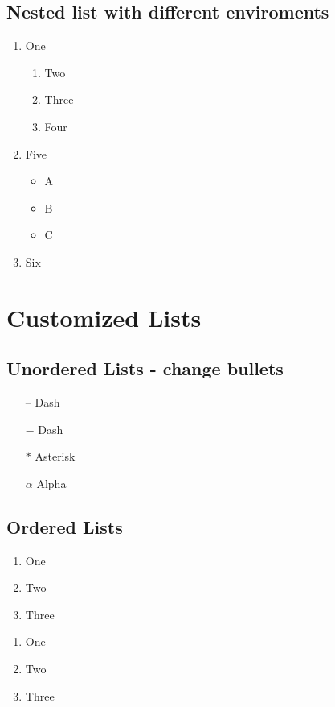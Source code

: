 \documentclass{article}
\begin{document}
\subsection{Nested list with different enviroments}
\begin{enumerate}
	\item One
	\begin{enumerate}
		\item Two
		\item Three
		\item Four
	\end{enumerate}
	\item Five
	\begin{itemize}
		\item A
		\item B
		\item C
	\end{itemize}
	\item Six
\end{enumerate}


\section{Customized Lists}
\subsection{Unordered Lists - change bullets}
\begin{itemize}
	\item[--] Dash
	\item[$-$] Dash
	\item[$\ast$] Asterisk
	\item[$\alpha$] Alpha
\end{itemize}


\subsection{Ordered Lists}
\begin{enumerate}[label=(\roman*)]
	\item One
	\item Two
	\item Three
\end{enumerate}
\begin{enumerate}[label=(\arabic*)]
	\item One
	\item Two
	\item Three
\end{enumerate}
\end{document}
